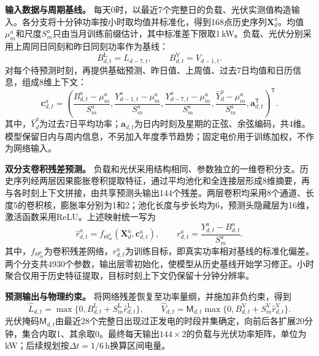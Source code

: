 \documentclass[withoutpreface,bwprint]{cumcmthesis}
\begin{document}
\textbf{输入数据与周期基线。}
每天0时，以最近7个完整日的负载、光伏实测值构造输入。各分支将十分钟功率按小时取均值并标准化，得到168点历史序列$\mathbf X_d^a$。均值$\mu_m^a$和尺度$S_m^a$只由当月训练前缀估计，其中标准差下限取1\,kW。负载、光伏分别采用上周同日同刻和昨日同刻功率作为基线：
\begin{equation}\label{eq:q2-base}
 B^{\mathrm L}_{d,t}=L_{d-7,t},\qquad B^{\mathrm V}_{d,t}=V_{d-1,t}.
\end{equation}
对每个待预测时刻，再提供基础预测、昨日值、上周值、过去7日均值和日历信息，组成8维上下文：
\begin{equation}\label{eq:q2-context}
 \mathbf c^a_{d,t}=\left(
 \frac{B^a_{d,t}-\mu_m^a}{S_m^a},
 \frac{Y^a_{d-1,t}-\mu_m^a}{S_m^a},
 \frac{Y^a_{d-7,t}-\mu_m^a}{S_m^a},
 \frac{\bar Y^a_d-\mu_m^a}{S_m^a},
 \mathbf a_{d,t}^{\mathsf T}\right)^{\mathsf T}.
\end{equation}
其中，$\bar Y_d^a$为过去7日平均功率；$\mathbf a_{d,t}$为日内时刻及星期的正弦、余弦编码，共4维。模型保留日内与周内信息，不另加入年度季节趋势；固定电价用于训练加权，不作为网络输入。

\textbf{双分支卷积残差预测。}
负载和光伏采用结构相同、参数独立的一维卷积分支。历史序列经两层因果膨胀卷积提取特征，通过平均池化和全连接层形成8维摘要，再与各时刻上下文拼接，由共享预测头输出144个残差。两层卷积均采用8个通道、长度5的卷积核，膨胀率分别为1和2；池化长度与步长均为6，预测头隐藏层为16维，激活函数采用ReLU。上述映射统一写为
\begin{equation}\label{eq:q2-network}
 \widehat r^a_{d,t}=f_{\Theta_m^a}(\mathbf X_d^a,\mathbf c^a_{d,t}),\qquad
 r^a_{d,t}=\frac{Y^a_{d,t}-B^a_{d,t}}{S_m^a}.
\end{equation}
其中，$f_{\Theta_m^a}$为卷积残差网络，$r^a_{d,t}$为训练目标，即真实功率相对基线的标准化偏差。两个分支共4930个参数，输出层零初始化，使模型从历史基线开始学习修正。小时聚合仅用于历史特征提取，目标时刻上下文仍保留十分钟分辨率。

\textbf{预测输出与物理约束。}
将网络残差恢复至功率量纲，并施加非负约束，得到
\begin{equation}\label{eq:q2-final}
 \widehat L_{d,t}=\max\{0,B^{\mathrm L}_{d,t}+S_m^{\mathrm L}\widehat r^{\mathrm L}_{d,t}\},\qquad
 \widehat V_{d,t}=\mathsf M_{d,t}\max\{0,B^{\mathrm V}_{d,t}+S_m^{\mathrm V}\widehat r^{\mathrm V}_{d,t}\}.
\end{equation}
光伏掩码$\mathsf M_{d,t}$由最近28个完整日出现过正发电的时段并集确定，向前后各扩展20分钟，集合内取1、其余取0。最终每天输出$144\times2$的负载与光伏功率矩阵，单位为kW；后续规划按$\Delta t=1/6$\,h换算区间电量。
\end{document}
